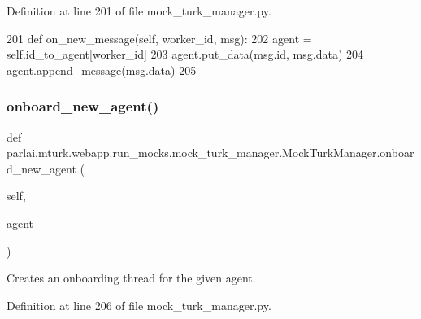 Definition at line 201 of file mock\+\_\+turk\+\_\+manager.\+py.


\begin{DoxyCode}
201     \textcolor{keyword}{def }on\_new\_message(self, worker\_id, msg):
202         agent = self.id\_to\_agent[worker\_id]
203         agent.put\_data(msg.id, msg.data)
204         agent.append\_message(msg.data)
205 
\end{DoxyCode}
\mbox{\label{classparlai_1_1mturk_1_1webapp_1_1run__mocks_1_1mock__turk__manager_1_1MockTurkManager_a16e055d5b5f244e0e53cda2d9225b487}} 
\subsubsection{\texorpdfstring{onboard\+\_\+new\+\_\+agent()}{onboard\_new\_agent()}}
{\footnotesize\ttfamily def parlai.\+mturk.\+webapp.\+run\+\_\+mocks.\+mock\+\_\+turk\+\_\+manager.\+Mock\+Turk\+Manager.\+onboard\+\_\+new\+\_\+agent (\begin{DoxyParamCaption}\item[{}]{self,  }\item[{}]{agent }\end{DoxyParamCaption})}

\begin{DoxyVerb}Creates an onboarding thread for the given agent.
\end{DoxyVerb}
 

Definition at line 206 of file mock\+\_\+turk\+\_\+manager.\+py.


